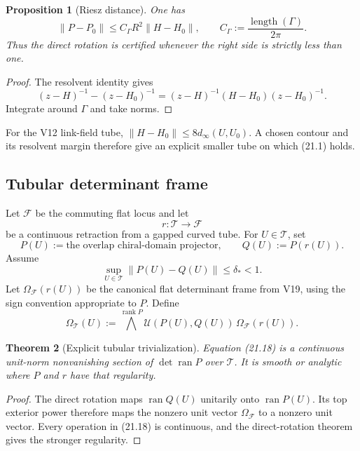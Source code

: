 \documentclass[11pt]{article}
\newtheorem{theorem}{Theorem}[section]
\newtheorem{proposition}[theorem]{Proposition}
\begin{document}
\begin{proposition}[Riesz distance]
\label{prop:v11v21-riesz-distance}
One has
\[
 \|P-P_0\|
 \leq
 C_\Gamma R^2\|H-H_0\|,
 \qquad
 C_\Gamma:=\frac{\operatorname{length}(\Gamma)}{2\pi}.
 \tag{21.14}
\]
Thus the direct rotation is certified whenever the right side is
strictly less than one.
\end{proposition}

\begin{proof}
The resolvent identity gives
\[
 (z-H)^{-1}-(z-H_0)^{-1}
 =
 (z-H)^{-1}(H-H_0)(z-H_0)^{-1}.
\]
Integrate around \(\Gamma\) and take norms.
\end{proof}

For the V12 link-field tube, \(\|H-H_0\|\leq8d_\infty(U,U_0)\).
A chosen contour and its resolvent margin therefore give an explicit
smaller tube on which (21.1) holds.

\subsection{Tubular determinant frame}

Let \(\mathcal F\) be the commuting flat locus and let
\[
 r:\mathcal T\longrightarrow\mathcal F
 \tag{21.15}
\]
be a continuous retraction from a gapped curved tube.  For
\(U\in\mathcal T\), set
\[
 P(U):=\text{the overlap chiral-domain projector},
 \qquad
 Q(U):=P(r(U)).
 \tag{21.16}
\]
Assume
\[
 \sup_{U\in\mathcal T}\|P(U)-Q(U)\|\leq\delta_*<1.
 \tag{21.17}
\]
Let \(\Omega_{\mathcal F}(r(U))\) be the canonical flat determinant frame
from V19, using the sign convention appropriate to \(P\).  Define
\[
 \Omega_{\mathcal T}(U)
 :=
 \bigwedge^{\operatorname{rank}P}
 \mathcal U(P(U),Q(U))\,
 \Omega_{\mathcal F}(r(U)).
 \tag{21.18}
\]

\begin{theorem}[Explicit tubular trivialization]
\label{thm:v11v21-tubular}
Equation (21.18) is a continuous unit-norm nonvanishing section of
\(\det\operatorname{ran}P\) over \(\mathcal T\).  It is smooth or analytic
where \(P\) and \(r\) have that regularity.
\end{theorem}

\begin{proof}
The direct rotation maps \(\operatorname{ran}Q(U)\) unitarily onto
\(\operatorname{ran}P(U)\).  Its top exterior power therefore maps the
nonzero unit vector \(\Omega_{\mathcal F}\) to a nonzero unit vector.
Every operation in (21.18) is continuous, and the direct-rotation theorem
gives the stronger regularity.
\end{proof}
\end{document}
